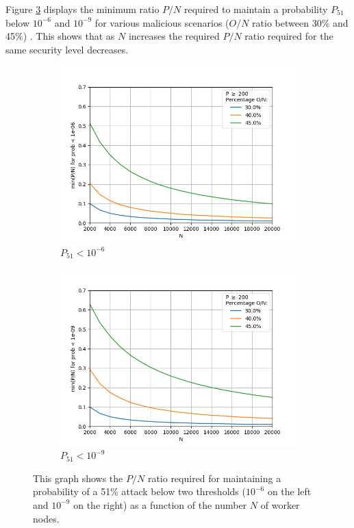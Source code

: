 Figure \ref{fig:threshV} displays the minimum ratio $P/N$ required to maintain a probability $P_{51}$ below $10^{-6}$ and $10^{-9}$ for various malicious scenarios ($O/N$ ratio between 30\% and 45\%) . This shows that as $N$ increases the required $P/N$ ratio required for the same security level decreases. 

\begin{figure}[H]
	\centering
	\begin{subfigure}[b]{0.45\textwidth}
		\includegraphics[width=\textwidth]{Figures/PoN_vs_N_Thre_Prob51_10em6_O30_to_45}
		
		\renewcommand{\thesubfigure}{a}
		\caption{$P_{51} < 10^{-6}$}
		\label{fig:N20-50}
	\end{subfigure}
	\begin{subfigure}[b]{0.45\textwidth}
		\includegraphics[width=\textwidth]{Figures/PoN_vs_N_Thre_Prob51_10em9_O30_to_45}
		
		\renewcommand{\thesubfigure}{b}
		\caption{$P_{51} < 10^{-9}$}
		\label{fig:N50-100}
	\end{subfigure}
\caption{\label{fig:threshV} This graph shows the $P/N$ ratio required for maintaining a probability of a 51\% attack below two thresholds ($10^{-6}$ on the left and $10^{-9}$ on the right) as a function of the number $N$ of worker nodes. }
\end{figure}

